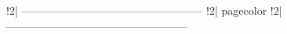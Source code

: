 !2| --------------------------------------------------
!2| {pagecolor}
!2| --------------------------------------------------

\usepackage{pagecolor}

\pagecolor{white}
